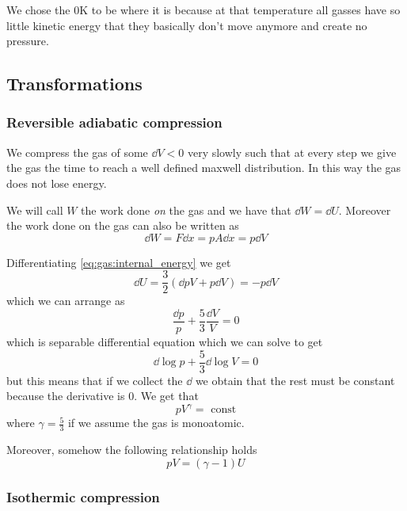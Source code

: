 \documentclass[12pt]{extarticle}
\begin{document}
We chose the $0 \si{\kelvin}$ to be where it is because at that temperature all gasses have so little kinetic energy that they basically don't move anymore and create no pressure.

\subsection{Transformations}

\subsubsection{Reversible adiabatic compression}

We compress the gas of some $\dd{V} < 0$ very slowly such that at every step we give the gas the time to reach a well defined maxwell distribution.
In this way the gas does not lose energy.

We will call $W$ the work done \emph{on} the gas and we have that $\dd{W} = \dd{U}$.
Moreover the work done on the gas can also be written as
\begin{equation}
    \dd{W} = F \dd{x} = p A \dd{x} = p \dd{V}
\end{equation}

Differentiating \autoref{eq:gas:internal_energy} we get
\begin{equation}
    \dd{U} = \frac{3}{2} (\dd{p} V + p \dd{V}) = -p\dd{V}
\end{equation}
which we can arrange as
\begin{equation}
    \frac{\dd{p}}{p} + \frac{5}{3}\frac{\dd{V}}{{V}} = 0
\end{equation}
which is separable differential equation which we can solve to get
\begin{equation}
    \dd{\log p} + \frac{5}{3} \dd{\log V} = 0
\end{equation}
but this means that if we collect the $\dd$ we obtain that the rest must be constant because the derivative is $0$.
We get that
\begin{equation}
    p V^\gamma = \text{ const}
\end{equation}
where $\gamma = \frac{5}{3}$ if we assume the gas is monoatomic.

Moreover, somehow the following relationship holds
\begin{equation}
    pV = (\gamma - 1) U
\end{equation}

\subsubsection{Isothermic compression}
\end{document}
